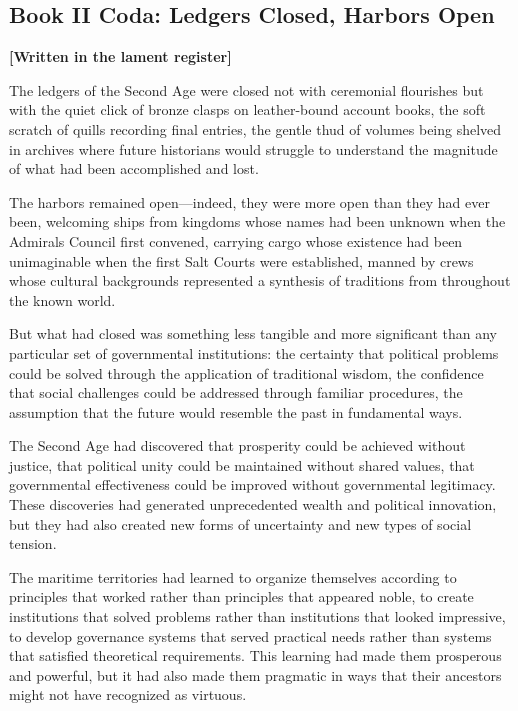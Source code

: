 \subsection{Book II Coda: Ledgers Closed, Harbors
Open}\label{book-ii-coda-ledgers-closed-harbors-open}

\textbf{{[}Written in the lament register{]}}

The ledgers of the Second Age were closed not with ceremonial flourishes
but with the quiet click of bronze clasps on leather-bound account
books, the soft scratch of quills recording final entries, the gentle
thud of volumes being shelved in archives where future historians would
struggle to understand the magnitude of what had been accomplished and
lost.

The harbors remained open---indeed, they were more open than they had
ever been, welcoming ships from kingdoms whose names had been unknown
when the Admiral\textquotesingle s Council first convened, carrying
cargo whose existence had been unimaginable when the first Salt Courts
were established, manned by crews whose cultural backgrounds represented
a synthesis of traditions from throughout the known world.

But what had closed was something less tangible and more significant
than any particular set of governmental institutions: the certainty that
political problems could be solved through the application of
traditional wisdom, the confidence that social challenges could be
addressed through familiar procedures, the assumption that the future
would resemble the past in fundamental ways.

The Second Age had discovered that prosperity could be achieved without
justice, that political unity could be maintained without shared values,
that governmental effectiveness could be improved without governmental
legitimacy. These discoveries had generated unprecedented wealth and
political innovation, but they had also created new forms of uncertainty
and new types of social tension.

The maritime territories had learned to organize themselves according to
principles that worked rather than principles that appeared noble, to
create institutions that solved problems rather than institutions that
looked impressive, to develop governance systems that served practical
needs rather than systems that satisfied theoretical requirements. This
learning had made them prosperous and powerful, but it had also made
them pragmatic in ways that their ancestors might not have recognized as
virtuous.

